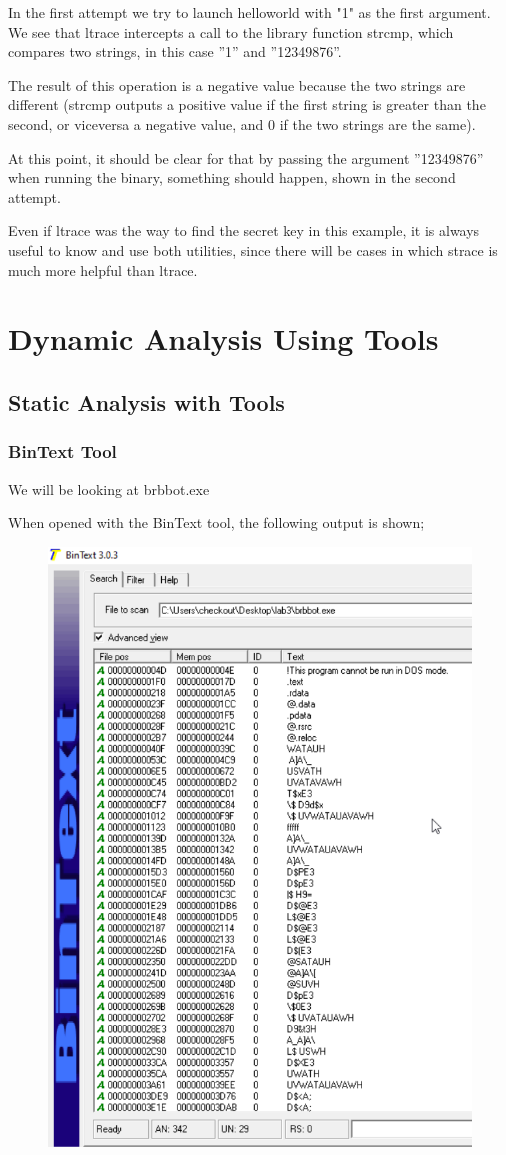 \documentclass[]{project_plan}
\begin{document}
In the first attempt we try to launch helloworld with "1" as the first argument.
We see that ltrace intercepts a call to the library function strcmp,
which compares two strings, in this case ”1” and ”12349876”.

The result of
this operation is a negative value because the two strings are different (strcmp
outputs a positive value if the first string is greater than the second, or viceversa
a negative value, and 0 if the two strings are the same).

At this point, it should
be clear for that by passing the argument ”12349876” when running the binary,
something should happen, shown in the second attempt.

Even if ltrace was the way to find the secret key in this example, it is
always useful to know and use both utilities, since there will be cases in which
strace is much more helpful than ltrace.

\section{Dynamic Analysis Using Tools}

\subsection{Static Analysis with Tools}

\subsubsection{BinText Tool}
We will be looking at brbbot.exe

When opened with the BinText tool, the following output is shown;

\begin{figure}[H]
  \centering
  \includegraphics[width=.5\linewidth]{lab3 bintext.png}
\end{figure}
\end{document}

